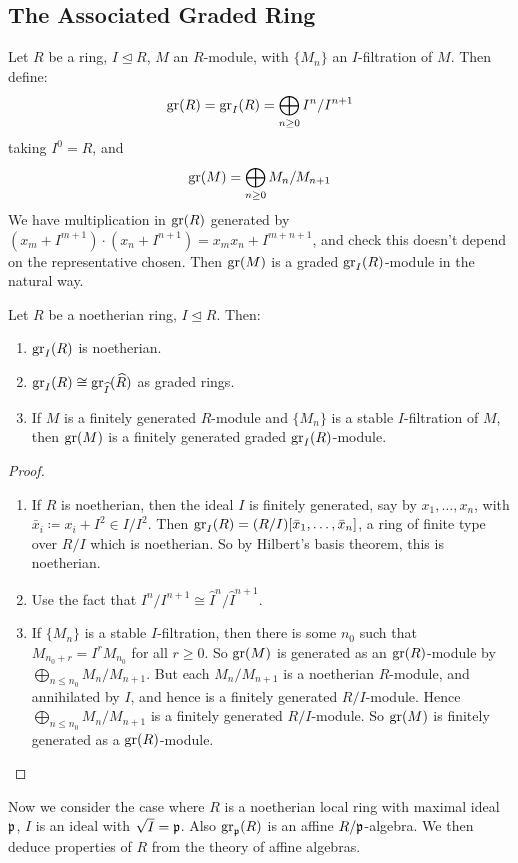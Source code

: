 \documentclass[10pt,a4paper]{article}
\begin{document}
\subsection{The Associated Graded Ring}
Let $R$ be a ring, $I \trianglelefteq R$, $M$ an $R$-module, with $\{M_n\}$ an $I$-filtration of $M$. Then define:
\[\operatorname{gr}(R) = \operatorname{gr}_I(R) = \bigoplus_{n\geq 0}I^n/I^{n+1}\]
taking $I^0 = R$, and
\[\operatorname{gr}(M) = \bigoplus_{n\geq 0}M_n/M_{n+1}\]
We have multiplication in $\operatorname{gr}(R)$ generated by $(x_m +I^{m+1})\cdot (x_n+I^{n+1}) = x_mx_n+I^{m+n+1}$, and check this doesn't depend on the representative chosen. Then $\operatorname{gr}(M)$ is a graded $\operatorname{gr}_I(R)$-module in the natural way.
\begin{proposition}
  Let $R$ be a noetherian ring, $I\trianglelefteq R$. Then:
  \begin{enumerate}
    \item $\operatorname{gr}_I(R)$ is noetherian.
    \item $\operatorname{gr}_I(R) \cong \operatorname{gr}_{\widehat{I}}(\widehat{R})$ as graded rings.
    \item If $M$ is a finitely generated $R$-module and $\{M_n\}$ is a stable $I$-filtration of $M$, then $\operatorname{gr}(M)$ is a finitely generated graded $\operatorname{gr}_I(R)$-module.
  \end{enumerate}
\end{proposition}
\begin{proof}\hspace*{0cm}
  \begin{enumerate}
    \item If $R$ is noetherian, then the ideal $I$ is finitely generated, say by $x_1, \ldots, x_n$, with $\bar{x}_i \coloneqq x_i + I^2 \in I/I^2$. Then $\operatorname{gr}_I(R) = (R/I)[\bar{x}_1, \ldots, \bar{x}_n]$, a ring of finite type over $R/I$ which is noetherian. So by Hilbert's basis theorem, this is noetherian.
    \item Use the fact that $I^n/I^{n+1}\cong \hat{I}^n/\hat{I}^{n+1}$.
    \item If $\{M_n\}$ is a stable $I$-filtration, then there is some $n_0$ such that $M_{n_0 + r} = I^r M_{n_0}$ for all $r \geq 0$. So $\operatorname{gr}(M)$ is generated as an $\operatorname{gr}(R)$-module by $\bigoplus_{n\leq n_0}M_n/M_{n+1}$. But each $M_n/M_{n+1}$ is a noetherian $R$-module, and annihilated by $I$, and hence is a finitely generated $R/I$-module. Hence $\bigoplus_{n\leq n_0}M_n/M_{n+1}$ is a finitely generated $R/I$-module. So $\operatorname{gr}(M)$ is finitely generated as a $\operatorname{gr}(R)$-module.
  \end{enumerate}
\end{proof}
Now we consider the case where $R$ is a noetherian local ring with maximal ideal $\mathfrak{p}$, $I$ is an ideal with $\sqrt{I} = \mathfrak{p}$. Also $\operatorname{gr}_{\mathfrak{p}}(R)$ is an affine $R/\mathfrak{p}$-algebra. We then deduce properties of $R$ from the theory of affine algebras.
\end{document}
